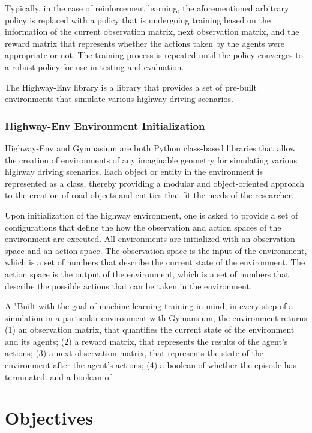 \documentclass[12pt, a4paper]{report}
\begin{document}
Typically, in the case of reinforcement learning, the aforementioned arbitrary policy is replaced with a policy that is undergoing training based on the information of 
the current observation matrix, next observation matrix, and the reward matrix that represents whether the actions taken by the agents were appropriate or not. 
The training process is repeated until the policy converges to a robust policy for use in testing and evaluation.

The Highway-Env library is a library that provides a set of pre-built environments that simulate various highway driving scenarios.

\subsubsection{Highway-Env Environment Initialization}

Highway-Env and Gymnasium are both Python class-based libraries that allow the creation of environments of any imaginable geometry for simulating various highway 
driving scenarios. Each object or entity in the environment is represented as a class, thereby providing a modular and object-oriented approach to the creation 
of road objects and entities that fit the needs of the researcher.

Upon initialization of the highway environment, one is asked to provide a set of configurations that define the how the observation and action spaces of the environment are executed.
All environments are initialized with an observation space and an action space.
The observation space is the input of the environment, which is a set of numbers that describe the current state of the environment. 
The action space is the output of the environment, which is a set of numbers that describe the possible actions that can be taken in the environment.

A "Built with the goal of machine learning training in mind, in every step of a simulation in a particular environment with Gymansium, the environment returns (1) an observation matrix, that
quantifies the current state of the environment and its agents; (2) a reward matrix, that represents the results of the agent's actions; 
(3) a next-observation matrix, that represents the state of the environment after the agent's actions; (4) a boolean of whether the episode has terminated.
and a boolean of  


\section{Objectives}
\end{document}
